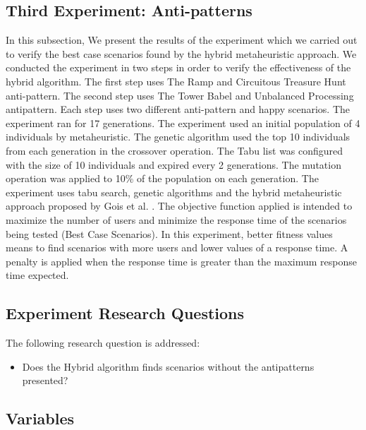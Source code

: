 \documentclass[espaco=umemeio,chapter=TITLE,twoside,openright]{abnt}
\begin{document}

\subsection{Third Experiment: Anti-patterns}

In this subsection, We present the results of the experiment which we carried out to verify the best case scenarios found by the hybrid metaheuristic approach. We conducted the experiment in two steps in order to verify the effectiveness of the hybrid algorithm.  The first step uses The Ramp and Circuitous Treasure Hunt anti-pattern. The second step uses The Tower Babel and Unbalanced Processing antipattern. Each step uses two different anti-pattern and happy scenarios. The experiment ran for 17 generations. The experiment used an initial population of 4 individuals by metaheuristic. The genetic algorithm used the top 10 individuals from each generation in the crossover operation. The Tabu list was configured with the size of 10 individuals and expired every 2 generations.  The mutation operation was applied to 10\% of the population on each generation. The experiment uses tabu search, genetic algorithms and the hybrid metaheuristic approach proposed by Gois et al. \cite{Gois2016}. The objective function applied is intended to maximize the number of users and minimize the response time of the scenarios being tested (Best Case Scenarios).  In this experiment, better fitness values means to find scenarios with more users and lower values of a response time. A penalty is applied when the response time is greater than the  maximum response time expected. 

\subsection{Experiment Research Questions}

The following research question is addressed:
\begin{itemize}
\item Does the Hybrid algorithm  finds scenarios without the antipatterns presented?
\end{itemize}

\subsection{Variables}
\end{document}
